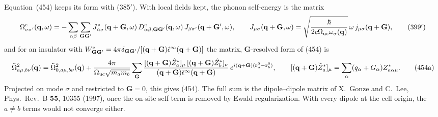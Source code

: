 Equation~(454) keeps its form with (385$'$). With local fields kept, the phonon self-energy is the matrix
\begin{equation}
\Omega^{\rm e}_{\sigma\sigma'}(\mathbf q,\omega)=-\sum_{\alpha\beta}\sum_{\mathbf G\mathbf G'}J^*_{\alpha\sigma}(\mathbf q+\mathbf G,\omega)\,D^{\rm e}_{\alpha\beta,\mathbf G\mathbf G'}(\mathbf q,\omega)\,J_{\beta\sigma'}(\mathbf q+\mathbf G',\omega),\qquad
J_{\mu\sigma}(\mathbf q+\mathbf G,\omega)=\sqrt{\frac{\hbar}{2c\Omega_{\rm uc}\omega_\sigma(\mathbf q)}}\,\omega\,j_{\mu\sigma}(\mathbf q+\mathbf G),\tag{399$'$}
\end{equation}
and for an insulator with $W^{\rm e}_{\mathbf G\mathbf G'}=4\pi\delta_{\mathbf G\mathbf G'}/[(\mathbf q+\mathbf G)\hat\epsilon^\infty(\mathbf q+\mathbf G)]$ the matrix, $\mathbf G$-resolved form of (454) is
\begin{equation}
\tilde\Omega^2_{a\mu,b\nu}(\mathbf q)=\tilde\Omega^2_{0,a\mu,b\nu}(\mathbf q)+\frac{4\pi}{\Omega_{\rm uc}\sqrt{m_am_b}}\sum_{\mathbf G}\frac{[(\mathbf q+\mathbf G)\hat Z^*_a]_\mu\,[(\mathbf q+\mathbf G)\hat Z^*_b]_\nu}{(\mathbf q+\mathbf G)\hat\epsilon^\infty(\mathbf q+\mathbf G)}\,e^{i(\mathbf q+\mathbf G)(\mathbf r^0_a-\mathbf r^0_b)},
\qquad[(\mathbf q+\mathbf G)\hat Z^*_a]_\mu=\sum_\alpha(q_\alpha+G_\alpha)Z^*_{a\alpha\mu}.\tag{454a}
\end{equation}
Projected on mode $\sigma$ and restricted to $\mathbf G=0$, this gives (454). The full sum is the dipole--dipole matrix of X.~Gonze and C.~Lee, Phys.\ Rev.\ B \textbf{55}, 10355 (1997), once the on-site self term is removed by Ewald regularization. With every dipole at the cell origin, the $a\neq b$ terms would not converge either.

